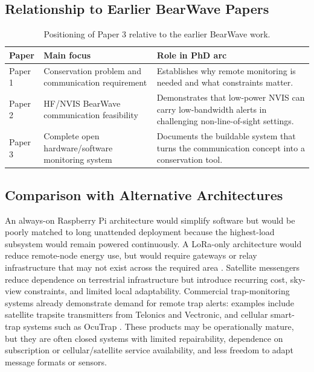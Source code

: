 \documentclass[acmsmall,screen]{acmart}
\begin{document}
\subsection{Relationship to Earlier BearWave Papers}
\begin{table}[tbp]
\centering
\caption{Positioning of Paper 3 relative to the earlier BearWave work.}
\label{tab:paper-positioning}
\begin{tabularx}{\textwidth}{p{}p{}X}
\toprule
Paper & Main focus & Role in PhD arc \\
\midrule
Paper 1 \cite{ButterworthMarkAndrew2025ERCi} & Conservation problem and communication requirement & Establishes why remote monitoring is needed and what constraints matter. \\
Paper 2 \cite{Butterworth2026BorneoFieldTrial} & HF/NVIS BearWave communication feasibility & Demonstrates that low-power NVIS can carry low-bandwidth alerts in challenging non-line-of-sight settings. \\
Paper 3 & Complete open hardware/software monitoring system & Documents the buildable system that turns the communication concept into a conservation tool. \\
\bottomrule
\end{tabularx}
\end{table}

\subsection{Comparison with Alternative Architectures}
An always-on Raspberry Pi architecture would simplify software but would be poorly matched to long unattended deployment because the highest-load subsystem would remain powered continuously. A LoRa-only architecture would reduce remote-node energy use, but would require gateways or relay infrastructure that may not exist across the required area \cite{Augustin2016LoRa}. Satellite messengers reduce dependence on terrestrial infrastructure but introduce recurring cost, sky-view constraints, and limited local adaptability. Commercial trap-monitoring systems already demonstrate demand for remote trap alerts: examples include satellite trapsite transmitters from Telonics and Vectronic, and cellular smart-trap systems such as OcuTrap \cite{TelonicsTrapsiteTransmitters,VectronicTT5,OcuTrapSmartWildlifeTraps}. These products may be operationally mature, but they are often closed systems with limited repairability, dependence on subscription or cellular/satellite service availability, and less freedom to adapt message formats or sensors.
\end{document}
